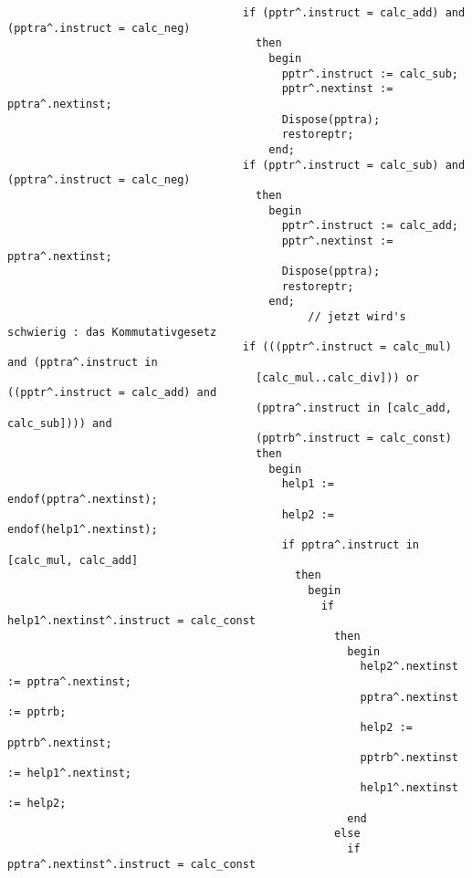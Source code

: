 \begin{refsection}
\begin{lstlisting}
                                    if (pptr^.instruct = calc_add) and (pptra^.instruct = calc_neg)
                                      then
                                        begin
                                          pptr^.instruct := calc_sub;
                                          pptr^.nextinst := pptra^.nextinst;
                                          Dispose(pptra);
                                          restoreptr;
                                        end;
                                    if (pptr^.instruct = calc_sub) and (pptra^.instruct = calc_neg)
                                      then
                                        begin
                                          pptr^.instruct := calc_add;
                                          pptr^.nextinst := pptra^.nextinst;
                                          Dispose(pptra);
                                          restoreptr;
                                        end;
                                              // jetzt wird's schwierig : das Kommutativgesetz
                                    if (((pptr^.instruct = calc_mul) and (pptra^.instruct in
                                      [calc_mul..calc_div])) or ((pptr^.instruct = calc_add) and
                                      (pptra^.instruct in [calc_add, calc_sub]))) and
                                      (pptrb^.instruct = calc_const)
                                      then
                                        begin
                                          help1 := endof(pptra^.nextinst);
                                          help2 := endof(help1^.nextinst);
                                          if pptra^.instruct in [calc_mul, calc_add]
                                            then
                                              begin
                                                if help1^.nextinst^.instruct = calc_const
                                                  then
                                                    begin
                                                      help2^.nextinst := pptra^.nextinst;
                                                      pptra^.nextinst := pptrb;
                                                      help2 := pptrb^.nextinst;
                                                      pptrb^.nextinst := help1^.nextinst;
                                                      help1^.nextinst := help2;
                                                    end
                                                  else
                                                    if pptra^.nextinst^.instruct = calc_const

\end{lstlisting}
\end{refsection}
